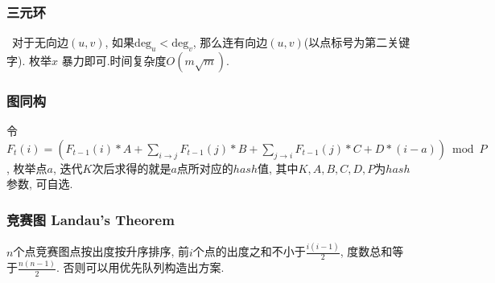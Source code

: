 \begin{comment}
	\paragraph{二物流}
	水源S1, 水汇T1, 油源S2, 油汇T2, 每根管道流量共用. 求流量和最大.
	建超级源SS1汇TT1, 连边SS1$\to$S1,SS1$\to$S2,T1$\to$TT1,T2$\to$TT1, 设最大流为x1.
	建超级源SS2汇TT2, 连边SS2$\to$S1,SS2$\to$T2,T1$\to$TT2,S2$\to$TT2, 设最大流为x2.
	则最大流中水流量$\frac{x1+x2}{2}$, 油流量$\frac{x1-x2}{2}$.
\end{comment}
\begin{comment}
\subsubsection{割点于割边}
        \paragraph{割点 割边} 一个点$u$是割点, 当且仅当: 1. $u$为非树根且有树边$(u,v)$满足$dfn_u\leq low_v$; 2. u为树根且有多于一个的子树. 一条无向边$(u,v)$是桥, 当且仅当$(u,v)$是树边, 且满足$dfn_u<low_v$. 

\subsubsection{2-SAT}
    如果选$A$就必须选$B$就从$A$向$B$连一条边, 如果两个只能选一个的条件在同一个强连通分量中就不合法. 输出可行方案可以比较$X$和$X’$的$bl$的大小, 大的选$X’$. 建图优化一般考虑前后缀的合并. 
\end{comment}
\subsubsection{三元环}\
               对于无向边$(u,v)$, 如果$\mathrm{deg}_u<\mathrm{deg}_v$, 那么连有向边$(u,v)$(以点标号为第二关键字). 枚举$x$ 暴力即可.时间复杂度$O(m\sqrt{m})$. 
\subsubsection{图同构}
                令$F_t(i)=(F_{t-1}(i)*A+\sum_{i\to j} F_{t-1}(j)*B+\sum_{j\to i} F_{t-1}(j)*C+D*(i-a)) \bmod P$, 枚举点$a$, 迭代$K$次后求得的就是$a$点所对应的$hash$值, 其中$K,A,B,C,D,P$为$hash$参数, 可自选. 

\subsubsection{竞赛图 Landau's Theorem}
    $n$个点竞赛图点按出度按升序排序, 前$i$个点的出度之和不小于$\frac{i(i-1)}{2}$, 度数总和等于$\frac{n(n-1)}{2}$. 否则可以用优先队列构造出方案.

